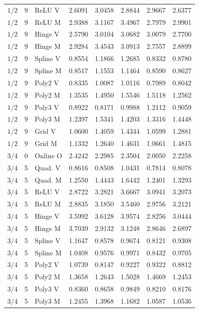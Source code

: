 \begin{longtable}{rrlrrrrr}
$1/2$ & 9 & ReLU V & 2.6091 & 3.0458 & 2.8844 & 2.9667 & 2.6377\\
$1/2$ & 9 & ReLU M & 2.9388 & 3.1167 & 3.4967 & 2.7979 & 2.9901\\
$1/2$ & 9 & Hinge V & 2.5790 & 3.0104 & 3.0682 & 3.0079 & 2.7700\\
$1/2$ & 9 & Hinge M & 2.9284 & 3.4543 & 3.0913 & 2.7557 & 2.8899\\
$1/2$ & 9 & Spline V & 0.8554 & 1.1866 & 1.2685 & 0.8332 & 0.8780\\
$1/2$ & 9 & Spline M & 0.8517 & 1.1553 & 1.1464 & 0.8590 & 0.8627\\
$1/2$ & 9 & Poly2 V & 0.8335 & 1.0087 & 1.0116 & 0.7989 & 0.8042\\
$1/2$ & 9 & Poly2 M & 1.3535 & 1.4950 & 1.5546 & 1.5118 & 1.2562\\
$1/2$ & 9 & Poly3 V & 0.8922 & 0.8171 & 0.9988 & 1.2112 & 0.9059\\
$1/2$ & 9 & Poly3 M & 1.2397 & 1.5341 & 1.4203 & 1.3316 & 1.4448\\
$1/2$ & 9 & Grid V & 1.0600 & 1.4059 & 1.4344 & 1.0599 & 1.2881\\
$1/2$ & 9 & Grid M & 1.1332 & 1.2640 & 1.4631 & 1.0661 & 1.4815\\
$3/4$ & 0 & Online O & 2.4242 & 2.2985 & 2.3504 & 2.0050 & 2.2258\\
$3/4$ & 5 & Quad. V & 0.8616 & 0.8508 & 1.0431 & 0.7814 & 0.8078\\
$3/4$ & 5 & Quad. M & 1.2550 & 1.4443 & 1.6442 & 1.2401 & 1.3293\\
$3/4$ & 5 & ReLU V & 2.8722 & 3.2821 & 3.6667 & 3.0941 & 3.2073\\
$3/4$ & 5 & ReLU M & 2.8835 & 3.1850 & 3.5460 & 2.9756 & 3.2121\\
$3/4$ & 5 & Hinge V & 3.5992 & 3.6128 & 3.9574 & 2.8256 & 3.0444\\
$3/4$ & 5 & Hinge M & 3.7039 & 2.9132 & 3.1248 & 2.8646 & 2.6897\\
$3/4$ & 5 & Spline V & 1.1647 & 0.8578 & 0.9674 & 0.8121 & 0.9308\\
$3/4$ & 5 & Spline M & 1.0408 & 0.9576 & 0.9971 & 0.8432 & 0.9705\\
$3/4$ & 5 & Poly2 V & 1.0739 & 0.8147 & 0.9227 & 0.9322 & 0.8812\\
$3/4$ & 5 & Poly2 M & 1.3658 & 1.2643 & 1.5028 & 1.4669 & 1.2453\\
$3/4$ & 5 & Poly3 V & 0.8360 & 0.8658 & 0.9849 & 0.8210 & 0.8176\\
$3/4$ & 5 & Poly3 M & 1.2455 & 1.3968 & 1.1682 & 1.0587 & 1.0536\\

\end{longtable}
